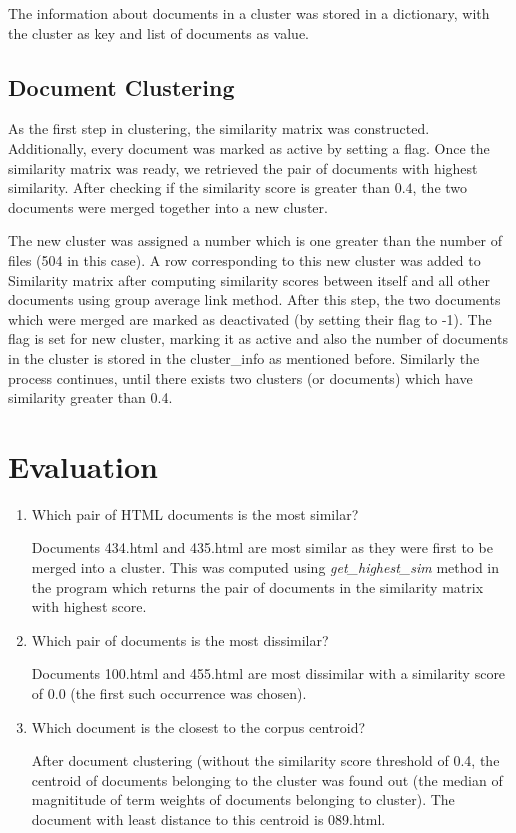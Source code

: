 \documentclass[paper=a4, fontsize=11pt]{scrartcl}
\numberwithin{equation}{section}		%
\numberwithin{figure}{section}			%
\numberwithin{table}{section}				%
\begin{document}
The information about documents in a cluster was stored in a dictionary, with the cluster as key and list of documents as value.

\subsection{Document Clustering}

As the first step in clustering, the similarity matrix was constructed. Additionally, every document was marked as active by setting a flag. Once the similarity matrix was ready, we retrieved the pair of documents with highest similarity. After checking if the similarity score is greater than $0.4$, the two documents were merged together into a new cluster.

The new cluster was assigned a number which is one greater than the number of files (504 in this case). A row corresponding to this new cluster was added to Similarity matrix after computing similarity scores between itself and all other documents using group average link method. After this step, the two documents which were merged are marked as deactivated (by setting their flag to -1). The flag is set for new cluster, marking it as active and also the number of documents in the cluster is stored in the cluster\_info as mentioned before. Similarly the process continues, until there exists two clusters (or documents) which have similarity greater than 0.4.

\section{Evaluation}

\begin{enumerate}
\item Which pair of HTML documents is the most similar? 

Documents 434.html and 435.html are most similar as they were first to be merged into a cluster. This was computed using \textit{get\_highest\_sim} method in the program which returns the pair of documents in the similarity matrix with highest score. 

\item Which pair of documents is the most dissimilar?
 
Documents 100.html and 455.html are most dissimilar with a similarity score of 0.0 (the first such occurrence was chosen).

\item Which document is the closest to the corpus centroid?

After document clustering (without the similarity score threshold of 0.4, the centroid of documents belonging to the cluster was found out (the median of magnititude of term weights of documents belonging to cluster). The document with least distance to this centroid is 089.html.  

\end{enumerate} 
\end{document}
